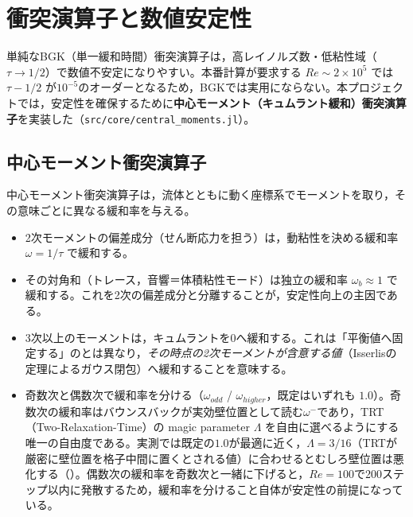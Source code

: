 \section{衝突演算子と数値安定性}
\label{sec:cumulant}

単純なBGK（単一緩和時間）衝突演算子は，高レイノルズ数・低粘性域（\(\tau\to1/2\)）で数値不安定になりやすい。本番計算が要求する \(Re\sim2\times10^5\) では \(\tau-1/2\) が\(10^{-5}\)のオーダーとなるため，BGKでは実用にならない。本プロジェクトでは，安定性を確保するために\textbf{中心モーメント（キュムラント緩和）衝突演算子}を実装した（\texttt{src/core/central\_moments.jl}）。

\subsection{中心モーメント衝突演算子}

中心モーメント衝突演算子は，流体とともに動く座標系でモーメントを取り，その意味ごとに異なる緩和率を与える。

\begin{itemize}
	\item 2次モーメントの偏差成分（せん断応力を担う）は，動粘性を決める緩和率 \(\omega=1/\tau\) で緩和する。
	\item その対角和（トレース，音響＝体積粘性モード）は独立の緩和率 \(\omega_b\approx1\) で緩和する。これを2次の偏差成分と分離することが，安定性向上の主因である。
	\item 3次以上のモーメントは，キュムラントを0へ緩和する。これは「平衡値へ固定する」のとは異なり，\emph{その時点の2次モーメントが含意する値}（Isserlisの定理によるガウス閉包）へ緩和することを意味する。
	\item \label{item:wall-position}奇数次と偶数次で緩和率を分ける（\(\omega_{odd}\) / \(\omega_{higher}\)，既定はいずれも \(1.0\)）。奇数次の緩和率はバウンスバックが実効壁位置として読む\(\omega^-\)であり，TRT（Two-Relaxation-Time）の magic parameter \(\Lambda\) を自由に選べるようにする唯一の自由度である。実測では既定の\(1.0\)が最適に近く，\(\Lambda=3/16\)（TRTが厳密に壁位置を格子中間に置くとされる値）に合わせるとむしろ壁位置は悪化する（）。偶数次の緩和率を奇数次と一緒に下げると，\(Re=100\)で200ステップ以内に発散するため，緩和率を分けること自体が安定性の前提になっている。
\end{itemize}

